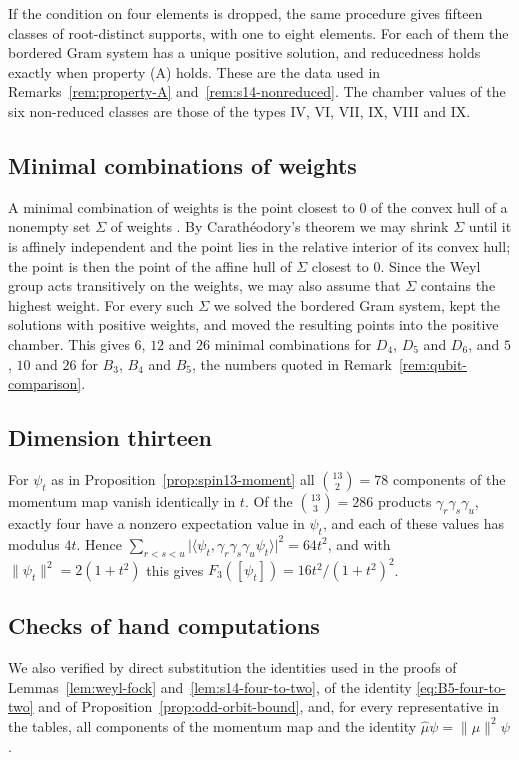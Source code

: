 \documentclass{article}
\theoremstyle{definition}
\theoremstyle{remark}
\newcommand{\norm}[1]{\lVert #1\rVert}
\begin{document}
If the condition on four elements is dropped, the same procedure gives
fifteen classes of root-distinct supports, with one to eight elements. For
each of them the bordered Gram system has a unique positive solution, and
reducedness holds exactly when property (A) holds. These are the data used in
Remarks~\ref{rem:property-A} and~\ref{rem:s14-nonreduced}. The chamber values
of the six non-reduced classes are those of the types IV, VI, VII, IX, VIII
and IX.

\subsection{Minimal combinations of weights}
\label{app:minimal-combinations}

A minimal combination of weights is the point closest to $0$ of the convex hull
of a nonempty set $\Sigma$ of weights
\cite{Kirwan_cohomology_84,MaciazekSawicki2015}. By Carath\'eodory's theorem
we may shrink $\Sigma$ until it is affinely independent and the point lies in
the relative interior of its convex hull; the point is then the point of the
affine hull of $\Sigma$ closest to $0$. Since the Weyl group acts transitively
on the weights, we may also assume that $\Sigma$ contains the highest weight. For every such $\Sigma$ we solved the bordered Gram system,
kept the solutions with positive weights, and moved the resulting points into
the positive chamber. This gives $6$, $12$ and $26$ minimal combinations for
$D_4$, $D_5$ and $D_6$, and $5$, $10$ and $26$ for $B_3$, $B_4$ and $B_5$, the
numbers quoted in Remark~\ref{rem:qubit-comparison}.

\subsection{Dimension thirteen}
\label{app:spin13-computation}

For $\psi_t$ as in Proposition~\ref{prop:spin13-moment} all
$\binom{13}{2}=78$ components of the momentum map vanish identically in $t$.
Of the $\binom{13}{3}=286$ products $\gamma_r\gamma_s\gamma_u$, exactly four
have a nonzero expectation value in $\psi_t$, and each of these values has
modulus $4t$. Hence
$\sum_{r<s<u}\lvert\langle\psi_t,\gamma_r\gamma_s\gamma_u\psi_t\rangle\rvert^2
=64t^2$, and with $\norm{\psi_t}^2=2(1+t^2)$ this gives
$F_3([\psi_t])=16t^2/(1+t^2)^2$.

\subsection{Checks of hand computations}

We also verified by direct substitution the identities used in the proofs of
Lemmas~\ref{lem:weyl-fock} and~\ref{lem:s14-four-to-two}, of the identity
\eqref{eq:B5-four-to-two} and of Proposition~\ref{prop:odd-orbit-bound}, and, for every representative in the
tables, all components of the momentum map and the identity
$\widehat\mu\psi=\norm\mu^2\psi$. 


\begingroup
\small


\endgroup
\end{document}
